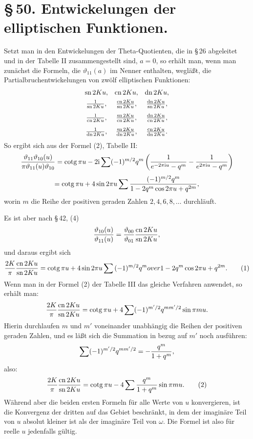 \documentclass[11pt]{article}
\providecommand{\tht}{\vartheta}
\providecommand{\sn}{\operatorname{sn}}
\providecommand{\cn}{\operatorname{cn}}
\providecommand{\dn}{\operatorname{dn}}
\providecommand{\ctg}{\operatorname{cotg}}
\providecommand{\ii}{\mathrm{i}}
\begin{document}
\section*{\S\,50. Entwickelungen der elliptischen Funktionen.}

Setzt man in den Entwickelungen der Theta-Quotienten, die in \S\,26 abgeleitet und in der Tabelle II zusammengestellt sind, $a=0$, so erhält man, wenn man zunächst die Formeln, die $\vartheta_{11}(a)$ im Nenner enthalten, wegläßt, die Partialbruchentwickelungen von zwölf elliptischen Funktionen:
\[
\begin{array}{ccc}
\sn 2Ku,& \cn 2Ku,& \dn 2Ku,\\[0.4em]
{1\over\sn 2Ku},& {\cn 2Ku\over\sn 2Ku},& {\dn 2Ku\over\sn 2Ku},\\[0.8em]
{1\over\cn 2Ku},& {\sn 2Ku\over\cn 2Ku},& {\dn 2Ku\over\cn 2Ku},\\[0.8em]
{1\over\dn 2Ku},& {\sn 2Ku\over\dn 2Ku},& {\cn 2Ku\over\dn 2Ku}.
\end{array}
\]
So ergibt sich aus der Formel (2), Tabelle II:
\[
{\tht_{11}\tht_{10}(u)\over\pi\tht_{11}(u)\tht_{10}}
=\ctg\pi u-2\ii\sum (-1)^{m/2}q^m\left({1\over e^{-2\pi\ii u}-q^m}-{1\over e^{2\pi\ii u}-q^m}\right)
\]
\[
=\ctg\pi u+4\sin2\pi u\sum {(-1)^{m/2}q^m\over1-2q^m\cos2\pi u+q^{2m}},
\]
worin $m$ die Reihe der positiven geraden Zahlen $2,4,6,8,\ldots$ durchläuft.

Es ist aber nach \S\,42, (4)
\[
{\tht_{10}(u)\over\tht_{11}(u)}={\tht_{00}\over\tht_{01}}{\cn2Ku\over\sn2Ku},
\]
und daraus ergibt sich
\begin{equation}
{2K\over\pi}{\cn2Ku\over\sn2Ku}
=\ctg\pi u+4\sin2\pi u\sum{(-1)^{m/2}q^m
over1-2q^m\cos2\pi u+q^{2m}}.
\tag{1}
\end{equation}
Wenn man in der Formel (2) der Tabelle III das gleiche Verfahren anwendet, so erhält man:
\[
{2K\over\pi}{\cn2Ku\over\sn2Ku}
=\ctg\pi u+4\sum(-1)^{m'/2}q^{mm'/2}\sin\pi m u.
\]
Hierin durchlaufen $m$ und $m'$ voneinander unabhängig die Reihen der positiven geraden Zahlen, und es läßt sich die Summation in bezug auf $m'$ noch ausführen:
\[
\sum(-1)^{m'/2}q^{mm'/2}=-{q^m\over1+q^m},
\]
also:
\begin{equation}
{2K\over\pi}{\cn2Ku\over\sn2Ku}
=\ctg\pi u-4\sum {q^m\over1+q^m}\sin\pi m u.
\tag{2}
\end{equation}
Während aber die beiden ersten Formeln für alle Werte von $u$ konvergieren, ist die Konvergenz der dritten auf das Gebiet beschränkt, in dem der imaginäre Teil von $u$ absolut kleiner ist als der imaginäre Teil von $\omega$. Die Formel ist also für reelle $u$ jedenfalls gültig.
\end{document}
